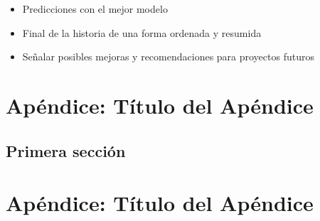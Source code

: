 \documentclass[12pt,a4paper,]{book}
\def\ifdoblecara{} %
\def\ifprincipal{} %
\providecommand{\tightlist}{%
  \setlength{\itemsep}{0pt}\setlength{\parskip}{0pt}}
\numberwithin{dummy}{section}
\theoremstyle{ocrenumbox}
\theoremstyle{blacknumex}
\theoremstyle{blacknumbox}
\theoremstyle{ocrenum}
\theoremstyle{ocrenum}
\begin{document}
\begin{itemize}
\tightlist
\item
  Predicciones con el mejor modelo
\item
  Final de la historia de una forma ordenada y resumida
\item
  Señalar posibles mejoras y recomendaciones para proyectos futuros
\end{itemize}

\FloatBarrier

\appendix

\ifdefined\ifprincipal
\else
\setlength{\parindent}{1em}
\pagestyle{fancy}
\setcounter{tocdepth}{4}
\tableofcontents

\fi

\ifdefined\ifdoblecara
\fancyhead{}{}
\fancyhead[LE,RO]{\scriptsize\rightmark}
\fancyfoot[LO,RE]{\scriptsize\slshape \leftmark}
\fancyfoot[C]{}
\fancyfoot[LE,RO]{\footnotesize\thepage}
\else
\fancyhead{}{}
\fancyhead[RO]{\scriptsize\rightmark}
\fancyfoot[LO]{\scriptsize\slshape \leftmark}
\fancyfoot[C]{}
\fancyfoot[RO]{\footnotesize\thepage}
\fi
\renewcommand{\headrulewidth}{0.4pt}
\renewcommand{\footrulewidth}{0.4pt}

\hypertarget{apuxe9ndice-tuxedtulo-del-apuxe9ndice}{%
\chapter{Apéndice: Título del
Apéndice}\label{apuxe9ndice-tuxedtulo-del-apuxe9ndice}}

\hypertarget{primera-secciuxf3n}{%
\section{Primera sección}\label{primera-secciuxf3n}}

\ifdefined\ifprincipal
\else
\setlength{\parindent}{1em}
\pagestyle{fancy}
\setcounter{tocdepth}{4}
\tableofcontents

\fi

\ifdefined\ifdoblecara
\fancyhead{}{}
\fancyhead[LE,RO]{\scriptsize\rightmark}
\fancyfoot[LO,RE]{\scriptsize\slshape \leftmark}
\fancyfoot[C]{}
\fancyfoot[LE,RO]{\footnotesize\thepage}
\else
\fancyhead{}{}
\fancyhead[RO]{\scriptsize\rightmark}
\fancyfoot[LO]{\scriptsize\slshape \leftmark}
\fancyfoot[C]{}
\fancyfoot[RO]{\footnotesize\thepage}
\fi
\renewcommand{\headrulewidth}{0.4pt}
\renewcommand{\footrulewidth}{0.4pt}

\hypertarget{apuxe9ndice-tuxedtulo-del-apuxe9ndice-1}{%
\chapter{Apéndice: Título del
Apéndice}\label{apuxe9ndice-tuxedtulo-del-apuxe9ndice-1}}
\end{document}
